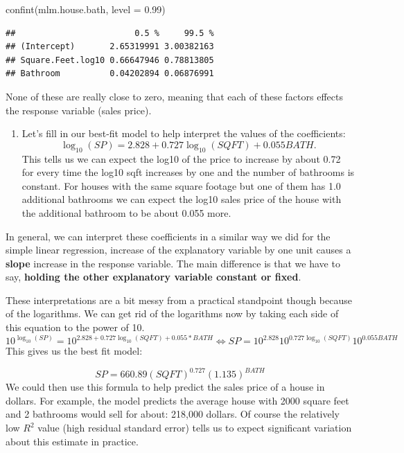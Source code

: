 \documentclass[
]{book}
\newenvironment{Shaded}{\begin{snugshade}}{\end{snugshade}}
\newcommand{\AttributeTok}[1]{\textcolor[rgb]{0.77,0.63,0.00}{#1}}
\newcommand{\FloatTok}[1]{\textcolor[rgb]{0.00,0.00,0.81}{#1}}
\newcommand{\FunctionTok}[1]{\textcolor[rgb]{0.00,0.00,0.00}{#1}}
\newcommand{\NormalTok}[1]{#1}
\providecommand{\tightlist}{%
  \setlength{\itemsep}{0pt}\setlength{\parskip}{0pt}}
\theoremstyle{definition}
\theoremstyle{definition}
\theoremstyle{definition}
\theoremstyle{definition}
\theoremstyle{remark}
\begin{document}
\begin{Shaded}
\begin{Highlighting}[]
\FunctionTok{confint}\NormalTok{(mlm.house.bath, }\AttributeTok{level =} \FloatTok{0.99}\NormalTok{)}
\end{Highlighting}
\end{Shaded}

\begin{verbatim}
##                        0.5 %     99.5 %
## (Intercept)       2.65319991 3.00382163
## Square.Feet.log10 0.66647946 0.78813805
## Bathroom          0.04202894 0.06876991
\end{verbatim}

None of these are really close to zero, meaning that each of these factors effects the response variable (sales price).

\begin{enumerate}
\def\labelenumi{\arabic{enumi}.}
\setcounter{enumi}{3}
\tightlist
\item
  Let's fill in our best-fit model to help interpret the values of the coefficients:
  \[ \log_{10}(SP)=2.828+0.727\log_{10}(SQFT)+0.055 BATH .\] This tells us we can expect the log10 of the price to increase by about 0.72 for every time the log10 sqft increases by one and the number of bathrooms is constant. For houses with the same square footage but one of them has 1.0 additional bathrooms we can expect the log10 sales price of the house with the additional bathroom to be about 0.055 more.
\end{enumerate}

In general, we can interpret these coefficients in a similar way we did for the simple linear regression, increase of the explanatory variable by one unit causes a \textbf{slope} increase in the response variable. The main difference is that we have to say, \textbf{holding the other explanatory variable constant or fixed}.

These interpretations are a bit messy from a practical standpoint though because of the logarithms. We can get rid of the logarithms now by taking each side of this equation to the power of 10.
\[10^{\log_{10}(SP)}=10^{2.828+0.727\log_{10}(SQFT)+0.055*BATH } \iff SP=10^{2.828} 10^{0.727\log_{10}(SQFT)} 10^{0.055 BATH}\]
This gives us the best fit model:

\[SP=660.89(SQFT)^{0.727}(1.135)^{BATH}\]
We could then use this formula to help predict the sales price of a house in dollars. For example, the model predicts the average house with 2000 square feet and 2 bathrooms would sell for about: 218,000 dollars. Of course the relatively low \(R^2\) value (high residual standard error) tells us to expect significant variation about this estimate in practice.
\end{document}
